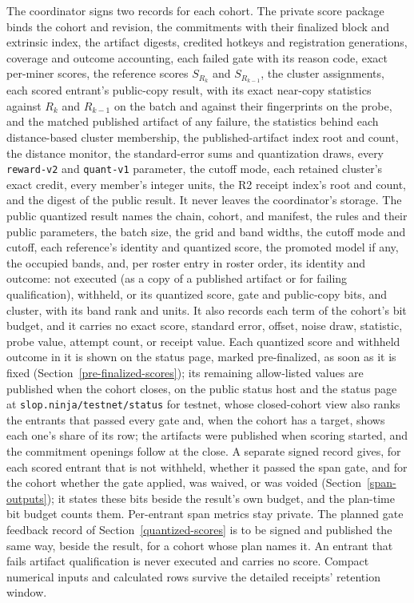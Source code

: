 The coordinator signs two records for each cohort. The private score package
binds the cohort and revision, the commitments with their finalized block and
extrinsic index, the artifact digests, credited hotkeys and registration
generations, coverage and outcome accounting, each failed gate with its reason
code, exact per-miner scores, the reference scores \(S_{R_k}\) and
\(S_{R_{k-1}}\), the cluster assignments, each scored entrant's public-copy
result, with its exact near-copy statistics against \(R_k\) and \(R_{k-1}\) on
the batch and against their fingerprints on the probe, and the matched
published artifact of any failure, the statistics behind each distance-based
cluster membership, the published-artifact index root and count, the distance
monitor, the standard-error sums and quantization draws, every
\texttt{reward-v2} and \texttt{quant-v1} parameter, the cutoff mode, each
retained cluster's exact credit, every member's integer units, the R2 receipt
index's root and count, and the digest of the public result. It never leaves
the coordinator's storage. The public quantized result names the chain, cohort,
and manifest, the rules and their public parameters, the batch size, the grid
and band widths, the cutoff mode and cutoff, each reference's identity and
quantized score, the promoted model if any, the occupied bands, and, per roster
entry in roster order, its identity and outcome: not executed (as a copy of a
published artifact or for failing qualification), withheld, or its
quantized score, gate and public-copy bits, and cluster, with its band rank and
units. It also records each term of the cohort's bit budget, and it carries no
exact score, standard error, offset, noise draw, statistic, probe value, attempt
count, or receipt value. Each quantized score and withheld outcome in it is
shown on the status page, marked pre-finalized, as soon as it is fixed
(Section~\ref{pre-finalized-scores}); its remaining allow-listed values are
published when the cohort closes, on the public status host and the status
page at \texttt{slop.ninja/testnet/status} for testnet, whose closed-cohort
view also ranks the entrants that passed every gate and, when the cohort has a
target, shows each one's share of its row; the artifacts were
published when scoring started, and the commitment openings follow at the
close. A separate signed record gives, for each scored entrant that is not
withheld, whether it passed the span gate, and for the cohort whether the gate
applied, was waived, or was voided (Section~\ref{span-outputs}); it states
these bits beside the result's own budget, and the plan-time bit budget counts
them. Per-entrant span metrics stay private. The planned gate feedback record
of Section~\ref{quantized-scores} is to be signed and published the same way,
beside the result, for a cohort whose plan names it. An entrant that fails
artifact qualification is never executed and carries no score. Compact
numerical inputs and calculated rows survive the detailed receipts' retention
window.

